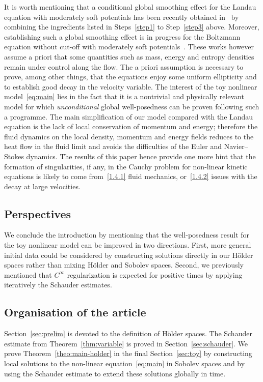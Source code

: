 \documentclass[AHL,Unicode,longabstracts,published]{cedram}
\begin{document}
It is worth mentioning that a conditional global smoothing effect for the Landau equation with moderately soft potentials has been recently obtained in~\cite{hs} by combining the ingredients listed in Steps~\ref{step1} to Step~\ref{step3} above. Moreover, establishing such a global smoothing effect is in progress for the Boltzmann equation without cut-off with moderately soft potentials~\cite{bootstrap}. These works however assume a priori that some quantities such as mass, energy and entropy densities remain under control along the flow. The a priori assumption is necessary to prove, among other things, that the equations enjoy some uniform ellipticity and to establish good decay in the velocity variable. The interest of the toy nonlinear model~\eqref{eq:main} lies in the fact that it is a nontrivial and physically relevant model for which \emph{unconditional} global well-posedness can be proven following such a programme. The main simplification of our model compared with the Landau equation is the lack of local conservation of momentum and energy; therefore the fluid dynamics on the local density, momentum and energy fields reduces to the heat flow in the fluid limit and avoids the difficulties of the Euler and Navier--Stokes dynamics. The results of this paper hence provide one more hint that the formation of singularities, if any, in the Cauchy problem for non-linear kinetic equations is likely to come from~\eqref{1.4.1} fluid mechanics, or~\eqref{1.4.2} issues with the decay at large velocities.

\subsection{Perspectives}

We conclude the introduction by mentioning that the well-posedness result for the toy nonlinear model can be improved in two directions. First, more general initial data could be considered by constructing solutions directly in our H\"older spaces rather than mixing H\"older and Sobolev spaces. Second, we previously mentioned that $C^\infty$ regularization is expected for positive times by applying iteratively the Schauder estimates.

\subsection{Organisation of the article}

Section~\ref{sec:prelim} is devoted to the definition of H\"older spaces. The Schauder estimate from Theorem~\ref{thm:variable} is proved in Section~\ref{sec:schauder}. We prove Theorem~\ref{theo:main-holder} in the final Section~\ref{sec:toy} by constructing local solutions to the non-linear equation~\eqref{eq:main} in Sobolev spaces and by using the Schauder estimate to extend these solutions globally in time.
\end{document}
